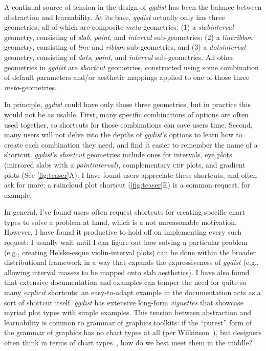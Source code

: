 \documentclass[journal]{vgtc}                     %
\begin{document}
A continual source of tension in the design of \textit{ggdist} has been the balance between abstraction and learnability. At its base, \textit{ggdist} actually only has three geometries, all of which are composite \textit{meta}-geometries: (1) a \textit{slabinterval} geometry, consisting of \textit{slab}, \textit{point}, and \textit{interval} sub-geometries; (2) a \textit{lineribbon} geometry, consisting of \textit{line} and \textit{ribbon} sub-geometries; and (3) a \textit{dotsinterval} geometry, consisting of \textit{dots}, \textit{point}, and \textit{interval} sub-geometries. All other geometries in \textit{ggdist} are \textit{shortcut} geometries, constructed using some combination of default parameters and/or aesthetic mappings applied to one of those three \textit{meta}-geometries.

In principle, \textit{ggdist} could have only those three geometries, but in practice this would not be as usable. First, many specific combinations of options are often used together, so shortcuts for those combinations can save users time. Second, many users will not delve into the depths of \textit{ggdist}'s options to learn how to create each combination they need, and find it easier to remember the name of a shortcut. \textit{ggdist}'s \textit{shortcut} geometries include ones for intervals, eye plots (mirrored slabs with a \textit{pointinterval}), complementary \textsc{cdf} plots, and gradient plots (See \cref{fig:teaser}A). I have found users appreciate these shortcuts, and often ask for more: a raincloud plot shortcut (\cref{fig:teaser}E) is a common request, for example.

In general, I've found users often request shortcuts for creating specific chart types to solve a problem at hand, which is a not unreasonable motivation. However, I have found it productive to hold off on implementing every such request: I usually wait until I can figure out how solving a particular problem (e.g., creating Helske-esque violin-interval plots) can be done within the broader distributional framework in a way that expands the expressiveness of \textit{ggdist} (e.g., allowing interval masses to be mapped onto slab aesthetics). I have also found that extensive documentation and examples can temper the need for quite so many \textit{explicit} shortcuts; an easy-to-adapt example in the documentation acts as a sort of shortcut itself. \textit{ggdist} has extensive long-form \textit{vignettes} that showcase myriad plot types with simple examples. This tension between abstraction and learnability is common to grammar of graphics toolkits: if the ``purest'' form of the grammar of graphics has no chart types at all (per Wilkinson~\cite{wilkinson2012grammar}), but designers often think in terms of chart types~\cite{pu2023inpractice}, how do we best meet them in the middle?
\end{document}
